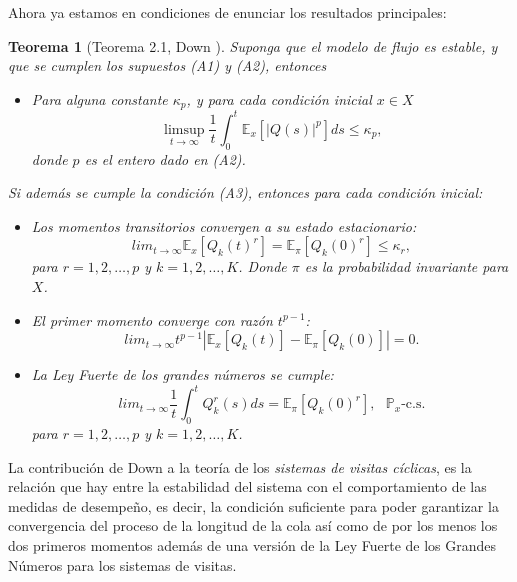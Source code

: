 \documentclass{article}
\newtheorem{Teo}{Teorema}[section]
\newcommand{\esp}{\mathbb{E}}
\newcommand{\prob}{\mathbb{P}}
\numberwithin{equation}{section}
\begin{document}
Ahora ya estamos en condiciones de enunciar los resultados principales:


\begin{Teo}[Teorema 2.1, Down \cite{Down}]\label{Tma2.1.Down}
Suponga que el modelo de flujo es estable, y que se cumplen los supuestos (A1) y (A2), entonces
\begin{itemize}
\item[i)] Para alguna constante $\kappa_{p}$, y para cada condici\'on inicial $x\in X$
\begin{equation}\label{Estability.Eq1}
\limsup_{t\rightarrow\infty}\frac{1}{t}\int_{0}^{t}\esp_{x}\left[|Q\left(s\right)|^{p}\right]ds\leq\kappa_{p},
\end{equation}
donde $p$ es el entero dado en (A2).
\end{itemize}
Si adem\'as se cumple la condici\'on (A3), entonces para cada condici\'on inicial:
\begin{itemize}
\item[ii)] Los momentos transitorios convergen a su estado estacionario:
 \begin{equation}\label{Estability.Eq2}
lim_{t\rightarrow\infty}\esp_{x}\left[Q_{k}\left(t\right)^{r}\right]=\esp_{\pi}\left[Q_{k}\left(0\right)^{r}\right]\leq\kappa_{r},
\end{equation}
para $r=1,2,\ldots,p$ y $k=1,2,\ldots,K$. Donde $\pi$ es la probabilidad invariante para $X$.

\item[iii)]  El primer momento converge con raz\'on $t^{p-1}$:
\begin{equation}\label{Estability.Eq3}
lim_{t\rightarrow\infty}t^{p-1}|\esp_{x}\left[Q_{k}\left(t\right)\right]-\esp_{\pi}\left[Q_{k}\left(0\right)\right]|=0.
\end{equation}

\item[iv)] La {\em Ley Fuerte de los grandes n\'umeros} se cumple:
\begin{equation}\label{Estability.Eq4}
lim_{t\rightarrow\infty}\frac{1}{t}\int_{0}^{t}Q_{k}^{r}\left(s\right)ds=\esp_{\pi}\left[Q_{k}\left(0\right)^{r}\right],\textrm{ }\prob_{x}\textrm{-c.s.}
\end{equation}
para $r=1,2,\ldots,p$ y $k=1,2,\ldots,K$.
\end{itemize}
\end{Teo}

La contribuci\'on de Down a la teor\'ia de los {\emph {sistemas de visitas c\'iclicas}}, es la relaci\'on que hay entre la estabilidad del sistema con el comportamiento de las medidas de desempe\~no, es decir, la condici\'on suficiente para poder garantizar la convergencia del proceso de la longitud de la cola as\'i como de por los menos los dos primeros momentos adem\'as de una versi\'on de la Ley Fuerte de los Grandes N\'umeros para los
sistemas de visitas.
\end{document}
